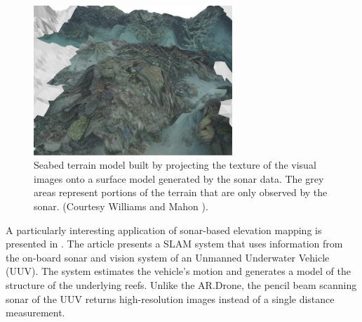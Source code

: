 \begin{figure}[htb]
\centering
\includegraphics[width=7.5cm]{images/williams_seabed_map.jpg}
\caption{Seabed terrain model built by projecting the texture of the visual images onto a surface model generated by the sonar data.
The grey areas represent portions of the terrain that are only observed by the sonar. (Courtesy Williams and Mahon \cite{williams2004simultaneous}).}
\label{fig:williams_seabed_map}
\end{figure}

A particularly interesting application of sonar-based elevation mapping is presented in \cite{williams2004simultaneous}.
The article presents a SLAM system that uses information from the on-board sonar and vision system of an Unmanned Underwater Vehicle (UUV).
The system estimates the vehicle's motion and generates a model of the structure of the underlying reefs.
Unlike the AR.Drone, the pencil beam scanning sonar of the UUV returns high-resolution images instead of a single distance measurement.


